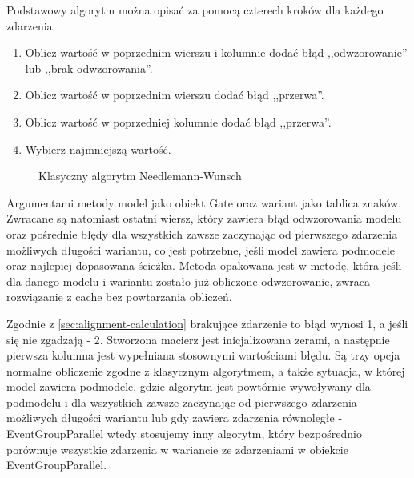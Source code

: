 Podstawowy algorytm można opisać za pomocą czterech kroków dla każdego zdarzenia:  
\begin{enumerate}
  \item Oblicz wartość w poprzednim wierszu i kolumnie dodać błąd ,,odwzorowanie'' lub ,,brak odwzorowania''.
  \item Oblicz wartość w poprzednim wierszu dodać błąd ,,przerwa''.
  \item Oblicz wartość w poprzedniej kolumnie dodać błąd ,,przerwa''.
  \item Wybierz najmniejszą wartość.
\end{enumerate}

\begin{figure}[h]
	\caption{\label{fig:algo_example}Klasyczny algorytm Needlemann-Wunsch}
\end{figure}


Argumentami metody model jako obiekt Gate oraz wariant jako tablica znaków. Zwracane są natomiast ostatni wiersz, który zawiera błąd odwzorowania modelu oraz pośrednie błędy dla wszystkich zawsze zaczynając od pierwszego zdarzenia możliwych długości wariantu, co jest potrzebne, jeśli model zawiera podmodele oraz najlepiej dopasowana ścieżka. Metoda opakowana jest w metodę, która jeśli dla danego modelu i wariantu zostało już obliczone odwzorowanie, zwraca rozwiązanie z cache bez powtarzania obliczeń.

Zgodnie z \ref{sec:alignment-calculation} brakujące zdarzenie to błąd wynosi 1, a jeśli się nie zgadzają - 2. Stworzona macierz jest inicjalizowana zerami, a następnie pierwsza kolumna jest wypełniana stosownymi wartościami błędu. Są trzy opcja normalne obliczenie zgodne z klasycznym algorytmem, a także sytuacja, w której model zawiera podmodele, gdzie algorytm jest powtórnie wywoływany dla podmodelu i dla wszystkich zawsze zaczynając od pierwszego zdarzenia możliwych długości wariantu lub gdy zawiera zdarzenia równoległe - EventGroupParallel wtedy stosujemy inny algorytm, który bezpośrednio porównuje wszystkie zdarzenia w wariancie ze zdarzeniami w obiekcie EventGroupParallel. 
     
